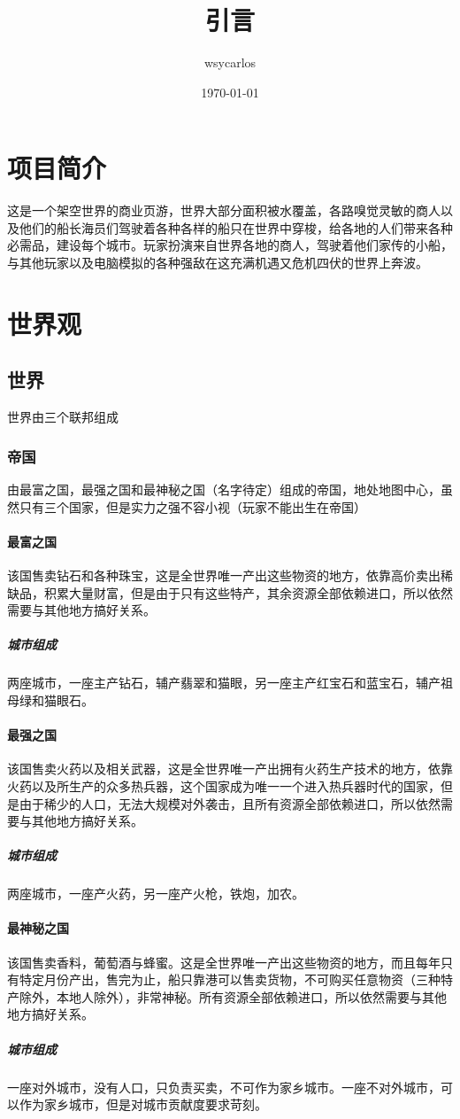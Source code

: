 \documentclass[UTF8]{ctexart}
\title{引言}
\author{wsycarlos}
\date{\today}
\begin{document}
\maketitle
\section{项目简介}
这是一个架空世界的商业页游，世界大部分面积被水覆盖，各路嗅觉灵敏的商人以及他们的船长海员们驾驶着各种各样的船只在世界中穿梭，给各地的人们带来各种必需品，建设每个城市。玩家扮演来自世界各地的商人，驾驶着他们家传的小船，与其他玩家以及电脑模拟的各种强敌在这充满机遇又危机四伏的世界上奔波。
\section{世界观}
\subsection{世界}
世界由三个联邦组成

\subsubsection{帝国}
由最富之国，最强之国和最神秘之国（名字待定）组成的帝国，地处地图中心，虽然只有三个国家，但是实力之强不容小视（玩家不能出生在帝国）
\paragraph{最富之国}
该国售卖钻石和各种珠宝，这是全世界唯一产出这些物资的地方，依靠高价卖出稀缺品，积累大量财富，但是由于只有这些特产，其余资源全部依赖进口，所以依然需要与其他地方搞好关系。
\subparagraph{城市组成}
两座城市，一座主产钻石，辅产翡翠和猫眼，另一座主产红宝石和蓝宝石，辅产祖母绿和猫眼石。

\paragraph{最强之国}
该国售卖火药以及相关武器，这是全世界唯一产出拥有火药生产技术的地方，依靠火药以及所生产的众多热兵器，这个国家成为唯一一个进入热兵器时代的国家，但是由于稀少的人口，无法大规模对外袭击，且所有资源全部依赖进口，所以依然需要与其他地方搞好关系。
\subparagraph{城市组成}
两座城市，一座产火药，另一座产火枪，铁炮，加农。

\paragraph{最神秘之国}
该国售卖香料，葡萄酒与蜂蜜。这是全世界唯一产出这些物资的地方，而且每年只有特定月份产出，售完为止，船只靠港可以售卖货物，不可购买任意物资（三种特产除外，本地人除外），非常神秘。所有资源全部依赖进口，所以依然需要与其他地方搞好关系。
\subparagraph{城市组成}
一座对外城市，没有人口，只负责买卖，不可作为家乡城市。一座不对外城市，可以作为家乡城市，但是对城市贡献度要求苛刻。
\end{document}

